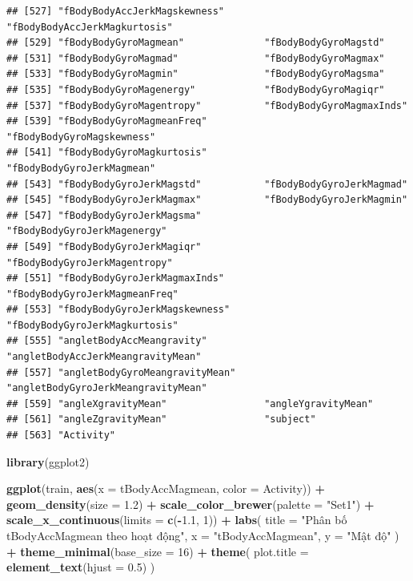 \documentclass[
]{article}
\newenvironment{Shaded}{\begin{snugshade}}{\end{snugshade}}
\newcommand{\AttributeTok}[1]{\textcolor[rgb]{0.13,0.29,0.53}{#1}}
\newcommand{\DecValTok}[1]{\textcolor[rgb]{0.00,0.00,0.81}{#1}}
\newcommand{\FloatTok}[1]{\textcolor[rgb]{0.00,0.00,0.81}{#1}}
\newcommand{\FunctionTok}[1]{\textcolor[rgb]{0.13,0.29,0.53}{\textbf{#1}}}
\newcommand{\NormalTok}[1]{#1}
\newcommand{\SpecialCharTok}[1]{\textcolor[rgb]{0.81,0.36,0.00}{\textbf{#1}}}
\newcommand{\StringTok}[1]{\textcolor[rgb]{0.31,0.60,0.02}{#1}}
\begin{document}
\begin{verbatim}
## [527] "fBodyBodyAccJerkMagskewness"       "fBodyBodyAccJerkMagkurtosis"      
## [529] "fBodyBodyGyroMagmean"              "fBodyBodyGyroMagstd"              
## [531] "fBodyBodyGyroMagmad"               "fBodyBodyGyroMagmax"              
## [533] "fBodyBodyGyroMagmin"               "fBodyBodyGyroMagsma"              
## [535] "fBodyBodyGyroMagenergy"            "fBodyBodyGyroMagiqr"              
## [537] "fBodyBodyGyroMagentropy"           "fBodyBodyGyroMagmaxInds"          
## [539] "fBodyBodyGyroMagmeanFreq"          "fBodyBodyGyroMagskewness"         
## [541] "fBodyBodyGyroMagkurtosis"          "fBodyBodyGyroJerkMagmean"         
## [543] "fBodyBodyGyroJerkMagstd"           "fBodyBodyGyroJerkMagmad"          
## [545] "fBodyBodyGyroJerkMagmax"           "fBodyBodyGyroJerkMagmin"          
## [547] "fBodyBodyGyroJerkMagsma"           "fBodyBodyGyroJerkMagenergy"       
## [549] "fBodyBodyGyroJerkMagiqr"           "fBodyBodyGyroJerkMagentropy"      
## [551] "fBodyBodyGyroJerkMagmaxInds"       "fBodyBodyGyroJerkMagmeanFreq"     
## [553] "fBodyBodyGyroJerkMagskewness"      "fBodyBodyGyroJerkMagkurtosis"     
## [555] "angletBodyAccMeangravity"          "angletBodyAccJerkMeangravityMean" 
## [557] "angletBodyGyroMeangravityMean"     "angletBodyGyroJerkMeangravityMean"
## [559] "angleXgravityMean"                 "angleYgravityMean"                
## [561] "angleZgravityMean"                 "subject"                          
## [563] "Activity"
\end{verbatim}

\begin{Shaded}
\begin{Highlighting}[]
\FunctionTok{library}\NormalTok{(ggplot2)}

\FunctionTok{ggplot}\NormalTok{(train, }\FunctionTok{aes}\NormalTok{(}\AttributeTok{x =}\NormalTok{ tBodyAccMagmean, }\AttributeTok{color =}\NormalTok{ Activity)) }\SpecialCharTok{+}
  \FunctionTok{geom\_density}\NormalTok{(}\AttributeTok{size =} \FloatTok{1.2}\NormalTok{) }\SpecialCharTok{+}
  \FunctionTok{scale\_color\_brewer}\NormalTok{(}\AttributeTok{palette =} \StringTok{"Set1"}\NormalTok{) }\SpecialCharTok{+}
  \FunctionTok{scale\_x\_continuous}\NormalTok{(}\AttributeTok{limits =} \FunctionTok{c}\NormalTok{(}\SpecialCharTok{{-}}\FloatTok{1.1}\NormalTok{, }\DecValTok{1}\NormalTok{)) }\SpecialCharTok{+} 
  \FunctionTok{labs}\NormalTok{(}
    \AttributeTok{title =} \StringTok{"Phân bố tBodyAccMagmean theo hoạt động"}\NormalTok{,}
    \AttributeTok{x =} \StringTok{"tBodyAccMagmean"}\NormalTok{,}
    \AttributeTok{y =} \StringTok{"Mật độ"}
\NormalTok{  ) }\SpecialCharTok{+}
  \FunctionTok{theme\_minimal}\NormalTok{(}\AttributeTok{base\_size =} \DecValTok{16}\NormalTok{) }\SpecialCharTok{+}
  \FunctionTok{theme}\NormalTok{(}
    \AttributeTok{plot.title =} \FunctionTok{element\_text}\NormalTok{(}\AttributeTok{hjust =} \FloatTok{0.5}\NormalTok{)}
\NormalTok{  )}
\end{Highlighting}
\end{Shaded}
\end{document}
